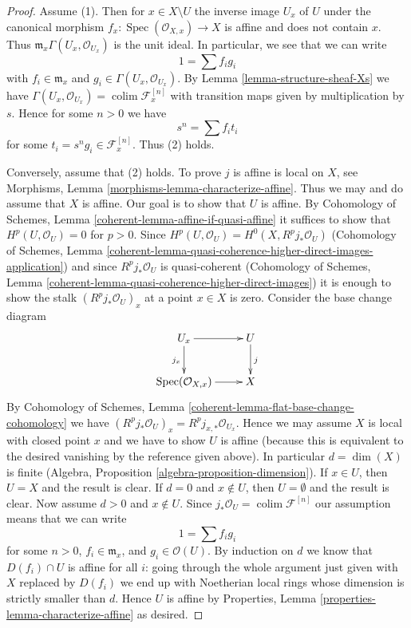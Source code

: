 \documentclass[10pt,a4paper]{amsart}
\theoremstyle{plain}
\theoremstyle{definition}
\theoremstyle{remark}
\numberwithin{equation}{subsection}
\def\colim{\mathop{\mathrm{colim}}\nolimits}
\def\Spec{\mathop{\mathrm{Spec}}}
\begin{document}
\begin{proof}
Assume (1). Then for $x \in X \setminus U$ the inverse image $U_x$ of $U$
under the canonical morphism $f_x : \Spec(\mathcal{O}_{X, x}) \to X$ is affine
and does not contain $x$. Thus $\mathfrak m_x \Gamma(U_x, \mathcal{O}_{U_x})$
is the unit ideal. In particular, we see that we can write
$$
1 = \sum f_i g_i
$$
with $f_i \in \mathfrak m_x$ and $g_i \in \Gamma(U_x, \mathcal{O}_{U_x})$.
By Lemma \ref{lemma-structure-sheaf-Xs} we have
$\Gamma(U_x, \mathcal{O}_{U_x}) = \colim \mathcal{F}^{[n]}_x$
with transition maps given by multiplication by $s$.
Hence for some $n > 0$ we have
$$
s^n = \sum f_i t_i
$$
for some $t_i = s^ng_i \in \mathcal{F}^{[n]}_x$. Thus (2) holds.

\medskip\noindent
Conversely, assume that (2) holds. To prove $j$ is affine is local on $X$,
see Morphisms, Lemma \ref{morphisms-lemma-characterize-affine}.
Thus we may and do assume that $X$ is affine. Our goal is to
show that $U$ is affine.
By Cohomology of Schemes, Lemma \ref{coherent-lemma-affine-if-quasi-affine}
it suffices to show that $H^p(U, \mathcal{O}_U) = 0$ for $p > 0$.
Since $H^p(U, \mathcal{O}_U) = H^0(X, R^pj_*\mathcal{O}_U)$
(Cohomology of Schemes, Lemma
\ref{coherent-lemma-quasi-coherence-higher-direct-images-application})
and since $R^pj_*\mathcal{O}_U$ is quasi-coherent
(Cohomology of Schemes, Lemma
\ref{coherent-lemma-quasi-coherence-higher-direct-images})
it is enough to show the stalk $(R^pj_*\mathcal{O}_U)_x$
at a point $x \in X$ is zero. Consider the base change diagram
$$
\xymatrix{
U_x \ar[d]_{j_x} \ar[r] & U \ar[d]^j \\
\Spec(\mathcal{O}_{X, x}) \ar[r] & X
}
$$
By Cohomology of Schemes, Lemma
\ref{coherent-lemma-flat-base-change-cohomology} we have
$(R^pj_*\mathcal{O}_U)_x = R^pj_{x, *}\mathcal{O}_{U_x}$.
Hence we may assume $X$ is local with closed point $x$
and we have to show $U$ is affine (because this is equivalent to
the desired vanishing by the reference given above).
In particular $d = \dim(X)$ is finite
(Algebra, Proposition \ref{algebra-proposition-dimension}).
If $x \in U$, then $U = X$ and the result is clear.
If $d = 0$ and $x \not \in U$, then $U = \emptyset$
and the result is clear. Now assume $d > 0$ and $x \not \in U$.
Since $j_*\mathcal{O}_U = \colim \mathcal{F}^{[n]}$
our assumption means that we can write
$$
1 = \sum f_i g_i
$$
for some $n > 0$, $f_i \in \mathfrak m_x$, and $g_i \in \mathcal{O}(U)$.
By induction on $d$ we know that $D(f_i) \cap U$ is affine
for all $i$: going through the whole argument just given with
$X$ replaced by $D(f_i)$ we end up with Noetherian local rings
whose dimension is strictly smaller than $d$. Hence $U$
is affine by Properties, Lemma \ref{properties-lemma-characterize-affine}
as desired.
\end{proof}
\end{document}
